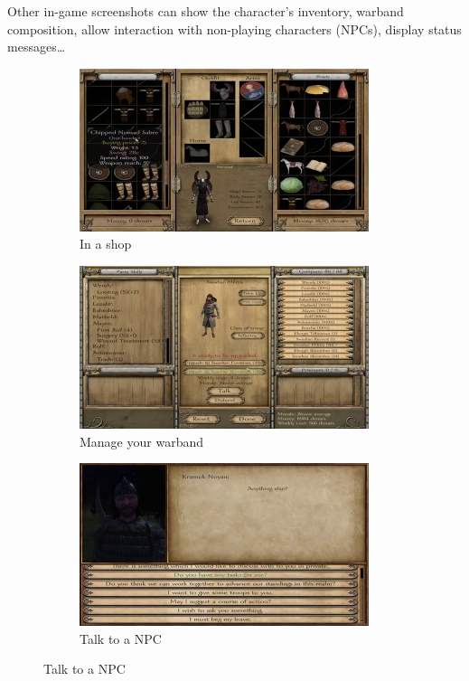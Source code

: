 \documentclass[
]{article}
\begin{document}
Other in-game screenshots can show the character's inventory, warband
composition, allow interaction with non-playing characters (NPCs), display status
messages\ldots{}


\begin{figure}
	\centering
	\begin{subfigure}[b]{0.3\textwidth}
		\includegraphics[width=\linewidth]{docimages/E_0056_00_31_30.jpg}
		\caption{In a shop}
	\end{subfigure}
	\begin{subfigure}[b]{0.3\textwidth}
		\includegraphics[width=\linewidth]{docimages/E_0056_00_58_08.jpg}
		\caption{Manage your warband}
	\end{subfigure}
	\begin{subfigure}[b]{0.3\textwidth}
		\includegraphics[width=\linewidth]{docimages/E_0059_00_26_26.jpg}
		\caption{Talk to a NPC}
	\end{subfigure}
\end{figure}
\end{document}
